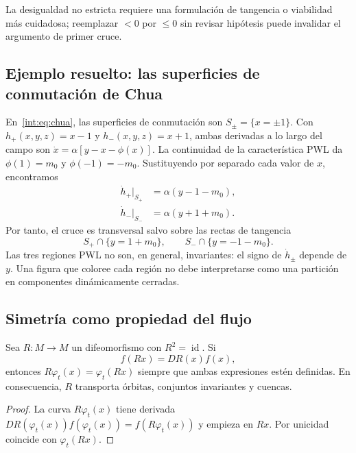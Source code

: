 

La desigualdad no estricta requiere una formulación de tangencia o viabilidad
más cuidadosa; reemplazar \(<0\) por \(\le0\) sin revisar hipótesis puede
invalidar el argumento de primer cruce.

\subsection{Ejemplo resuelto: las superficies de conmutación de Chua}

En~\eqref{int:eq:chua}, las superficies de conmutación son
\(S_\pm=\{x=\pm1\}\). Con \(h_+(x,y,z)=x-1\) y
\(h_-(x,y,z)=x+1\), ambas derivadas a lo largo del campo son
\(\dot x=\alpha[y-x-\phi(x)]\). La continuidad de la característica PWL
da \(\phi(1)=m_0\) y \(\phi(-1)=-m_0\). Sustituyendo por separado cada
valor de \(x\), encontramos
\begin{align}
 \dot h_+\big|_{S_+}&=\alpha(y-1-m_0),\nonumber\\
 \dot h_-\big|_{S_-}&=\alpha(y+1+m_0).
 \label{geo:eq:chua-switch-lie}
\end{align}
Por tanto, el cruce es transversal salvo sobre las rectas de tangencia
\begin{equation}
 S_+\cap\{y=1+m_0\},\qquad
 S_-\cap\{y=-1-m_0\}.
 \label{geo:eq:chua-grazing-lines}
\end{equation}
Las tres regiones PWL no son, en general, invariantes: el signo de
\(\dot h_\pm\) depende de \(y\). Una figura que coloree cada región no debe
interpretarse como una partición en componentes dinámicamente cerradas.

\subsection{Simetría como propiedad del flujo}

\begin{proposition}
Sea \(R:M\to M\) un difeomorfismo con \(R^2=\operatorname{id}\). Si
\begin{equation}
 f(Rx)=DR(x)f(x),
 \label{geo:eq:equivariant-field}
\end{equation}
entonces \(R\varphi_t(x)=\varphi_t(Rx)\) siempre que ambas expresiones estén
definidas. En consecuencia, \(R\) transporta órbitas, conjuntos invariantes y
cuencas.
\end{proposition}

\begin{proof}
La curva \(R\varphi_t(x)\) tiene derivada
\(DR(\varphi_t(x))f(\varphi_t(x))=f(R\varphi_t(x))\) y empieza en \(Rx\).
Por unicidad coincide con \(\varphi_t(Rx)\).
\end{proof}

